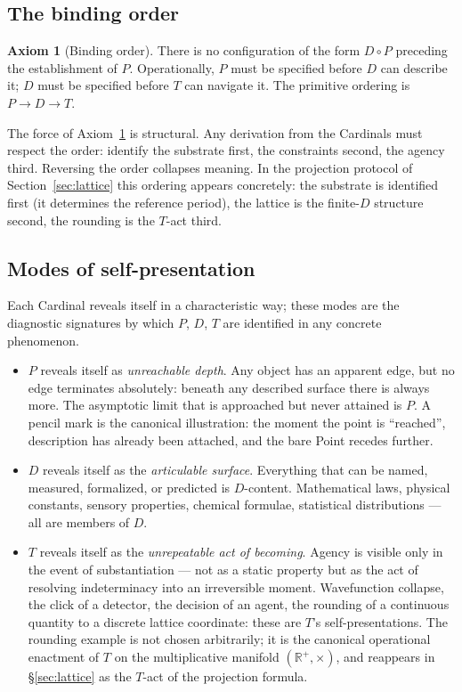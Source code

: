 \documentclass[11pt,a4paper]{article}
\theoremstyle{definition}
\newtheorem{axiom}[theorem]{Axiom}
\theoremstyle{remark}
\newcommand{\R}{\mathbb{R}}
\begin{document}
\subsection{The binding order}

\begin{axiom}[Binding order]\label{ax:order}
There is no configuration of the form $D \circ P$ preceding the establishment of $P$. Operationally, $P$ must be specified before $D$ can describe it; $D$ must be specified before $T$ can navigate it. The primitive ordering is $P \to D \to T$.
\end{axiom}

The force of Axiom~\ref{ax:order} is structural. Any derivation from the Cardinals must respect the order: identify the substrate first, the constraints second, the agency third. Reversing the order collapses meaning. In the projection protocol of Section~\ref{sec:lattice} this ordering appears concretely: the substrate is identified first (it determines the reference period), the lattice is the finite-$D$ structure second, the rounding is the $T$-act third.

\subsection{Modes of self-presentation}\label{subsec:modes}

Each Cardinal reveals itself in a characteristic way; these modes are the diagnostic signatures by which $P$, $D$, $T$ are identified in any concrete phenomenon.

\begin{itemize}[leftmargin=*]
\item $P$ reveals itself as \emph{unreachable depth}. Any object has an apparent edge, but no edge terminates absolutely: beneath any described surface there is always more. The asymptotic limit that is approached but never attained is $P$. A pencil mark is the canonical illustration: the moment the point is ``reached'', description has already been attached, and the bare Point recedes further.
\item $D$ reveals itself as the \emph{articulable surface}. Everything that can be named, measured, formalized, or predicted is $D$-content. Mathematical laws, physical constants, sensory properties, chemical formulae, statistical distributions --- all are members of $D$.
\item $T$ reveals itself as the \emph{unrepeatable act of becoming}. Agency is visible only in the event of substantiation --- not as a static property but as the act of resolving indeterminacy into an irreversible moment. Wavefunction collapse, the click of a detector, the decision of an agent, the rounding of a continuous quantity to a discrete lattice coordinate: these are $T$'s self-presentations. The rounding example is not chosen arbitrarily; it is the canonical operational enactment of $T$ on the multiplicative manifold $(\R^{+},\times)$, and reappears in \S\ref{sec:lattice} as the $T$-act of the projection formula.
\end{itemize}
\end{document}
